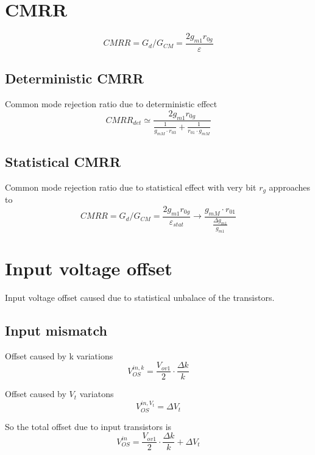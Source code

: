 \section{CMRR}
\begin{equation}
CMRR=G_d/G_{CM}=\frac{2g_{m1}r_{0g}}{\varepsilon}
\end{equation}

\subsection{Deterministic CMRR}
Common mode rejection ratio due to deterministic effect
\begin{equation}
CMRR_{det}\simeq \frac{2g_{m1}r_{0g}}{\frac{1}{g_{mM}\cdot r_{03}}+\frac{1}{r_{01}\cdot g_{mM}}}
\end{equation}

\subsection{Statistical CMRR}
Common mode rejection ratio due to statistical effect with very bit $r_g$ approaches to
\begin{equation}
CMRR=G_d/G_{CM}=\frac{2g_{m1}r_{0g}}{\varepsilon_{stat}}\rightarrow \frac{g_{mM}\cdot r_01}{\frac{\Delta g_{m1}}{g_{m1}}}
\end{equation}

\section{Input voltage offset}
Input voltage offset caused due to statistical unbalace of the transistors.\\
\subsection{Input mismatch}

Offset caused by k variations
\begin{equation}
V_{OS}^{in,k}=\frac{V_{ov1}}{2}\cdot \frac{\Delta k}{k}
\end{equation}

Offset caused by $V_t$ variatons
\begin{equation}
V_{OS}^{in,V_t}=\Delta V_t
\end{equation}

So the total offset due to input transistors is 
\begin{equation}
V_{OS}^{in}=\frac{V_{ov1}}{2}\cdot \frac{\Delta k}{k}+\Delta V_t
\end{equation}

